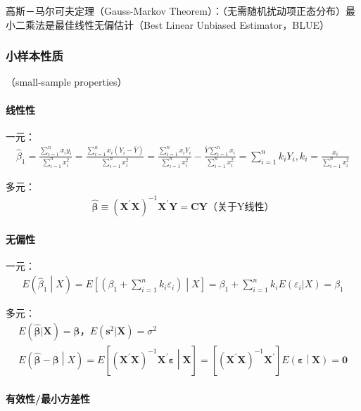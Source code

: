 \documentclass[12pt]{book}
\begin{document}
高斯－马尔可夫定理（Gauss-Markov Theorem）：（无需随机扰动项正态分布）最小二乘法是最佳线性无偏估计（Best Linear Unbiased Estimator，BLUE）

\subsubsection{小样本性质}

（small-sample properties）


\paragraph{线性性}

一元：
\begin{gather*}
    {\hat{\beta}}_1=\frac{\sum_{i=1}^{n}{x_iy_i}}{\sum_{i=1}^{n}x_i^2}=\frac{\sum_{i=1}^{n}{x_i\left(Y_i-\overline{Y}\right)}}{\sum_{i=1}^{n}x_i^2}=\frac{\sum_{i=1}^{n}{x_iY_i}}{\sum_{i=1}^{n}x_i^2}-\frac{\overline{Y}\sum_{i=1}^{n}x_i}{\sum_{i=1}^{n}x_i^2}=\sum_{i=1}^{n}{k_iY_i}, k_i=\frac{x_i}{\sum_{i=1}^{n}{x_i^2}}
\end{gather*}

多元：
\begin{gather*}
    \hat{\bm{\beta}}\equiv\left(\mathbf{X}^\prime\mathbf{X}\right)^{-1}\mathbf{X}^\prime\mathbf{Y}=\mathbf{CY}\text{（关于Y线性）}
\end{gather*}


\paragraph{无偏性}

一元：
\begin{gather*}
    E\left({\hat{\beta}}_1\middle| X\right)=E\left[\left(\beta_1+\sum_{i=1}^{n}{k_i\varepsilon_i}\right)\middle| X\right]=\beta_1+\sum_{i=1}^{n}{k_iE(\varepsilon_i|X)}=\beta_1
\end{gather*}


多元：
\begin{gather*}
    E(\hat{\bm{\beta}}|\bm{X}) =\bm{\beta}，E(\bm{s}^2|\bm{X})=\sigma^2\\
    E\left(\hat{\bm{\beta}}-\bm{\beta}\middle| X\right) =E\left[\left(\bm{X}^\prime\bm{X}\right)^{-1}\bm{X}^\prime\bm{\varepsilon}\middle|\bm{X}\right] =\left[\left(\bm{X}^\prime\bm{X}\right)^{-1}\bm{X}^\prime\right]E\left(\bm{\varepsilon}\middle|\bm{X}\right)=\bm{0}
\end{gather*}


\paragraph{有效性/最小方差性}
\end{document}
